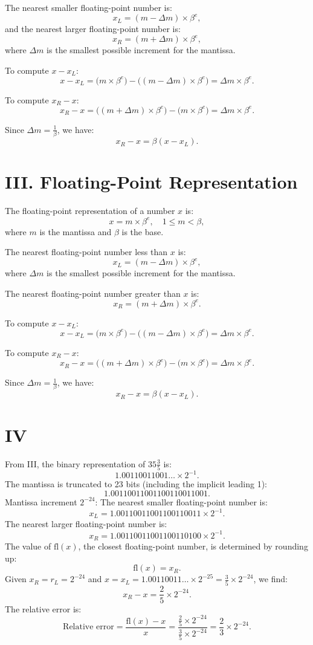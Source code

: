 \documentclass{article}
\begin{document}
The nearest smaller floating-point number is:
\[
x_L = (m - \Delta m) \times \beta^e,
\]
and the nearest larger floating-point number is:
\[
x_R = (m + \Delta m) \times \beta^e,
\]
where \( \Delta m \) is the smallest possible increment for the mantissa.

To compute \( x - x_L \):
\[
x - x_L = \big(m \times \beta^e\big) - \big((m - \Delta m) \times \beta^e\big) = \Delta m \times \beta^e.
\]

To compute \( x_R - x \):
\[
x_R - x = \big((m + \Delta m) \times \beta^e\big) - \big(m \times \beta^e\big) = \Delta m \times \beta^e.
\]

Since \( \Delta m = \frac{1}{\beta} \), we have:
\[
x_R - x = \beta (x - x_L).
\]

\section{III. Floating-Point Representation}

The floating-point representation of a number \( x \) is:
\[
x = m \times \beta^e, \quad 1 \leq m < \beta,
\]
where \( m \) is the mantissa and \( \beta \) is the base.

The nearest floating-point number less than \( x \) is:
\[
x_L = (m - \Delta m) \times \beta^e,
\]
where \( \Delta m \) is the smallest possible increment for the mantissa.

The nearest floating-point number greater than \( x \) is:
\[
x_R = (m + \Delta m) \times \beta^e.
\]

To compute \( x - x_L \):
\[
x - x_L = \big(m \times \beta^e\big) - \big((m - \Delta m) \times \beta^e\big) = \Delta m \times \beta^e.
\]

To compute \( x_R - x \):
\[
x_R - x = \big((m + \Delta m) \times \beta^e\big) - \big(m \times \beta^e\big) = \Delta m \times \beta^e.
\]

Since \( \Delta m = \frac{1}{\beta} \), we have:
\[
x_R - x = \beta (x - x_L).
\]

\section{IV}

From III, the binary representation of \( 35\frac{3}{5} \) is:  
\[
1.00110011001\ldots \times 2^{-1}.
\]  
The mantissa is truncated to 23 bits (including the implicit leading 1):  
\[
1.00110011001100110011001.
\]  
Mantissa increment \( 2^{-24} \):  
The nearest smaller floating-point number is:  
\[
x_L = 1.00110011001100110011 \times 2^{-1}.
\]  
The nearest larger floating-point number is:  
\[
x_R = 1.00110011001100110100 \times 2^{-1}.
\]  
The value of \( \text{fl}(x) \), the closest floating-point number, is determined by rounding up:  
\[
\text{fl}(x) = x_R.
\]  
Given \( x_R = r_L = 2^{-24} \) and \( x = x_L = 1.00110011\ldots \times 2^{-25} = \frac{3}{5} \times 2^{-24} \), we find:  
\[
x_R - x = \frac{2}{5} \times 2^{-24}.
\]  
The relative error is:  
\[
\text{Relative error} = \frac{\text{fl}(x) - x}{x} = \frac{\frac{2}{5} \times 2^{-24}}{\frac{3}{5} \times 2^{-24}} = \frac{2}{3} \times 2^{-24}.
\]
\end{document}
